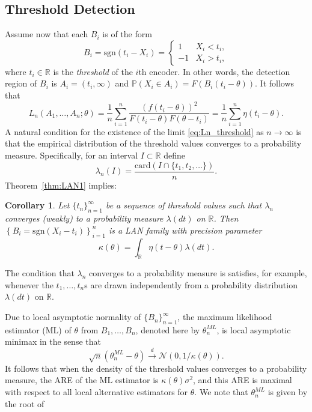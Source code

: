 \documentclass[letterpaper, 11pt]{IEEEtran}      %
\newtheorem{cor}[thm]{\bf {Corollary}}
\newcommand{\card}{\mathrm{card}}
\newcommand{\sgn}{\mathrm{sgn} }
\begin{document}
\subsection{Threshold Detection \label{subsec:threshold}}
Assume now that each $B_i$ is of the form
\begin{equation}
\label{eq:threshold_message}
B_i = \sgn(t_i - X_i) = \begin{cases} 1 & X_i< t_i, \\
-1 & X_i > t_i,
\end{cases}  
\end{equation}
where $t_i\in\mathbb R$ is the \emph{threshold} of the $i$th encoder. In other words, the detection region of $B_i$ is $A_i = (t_i,\infty)$ and $\mathbb P(X_i \in A_i) = F \left( B_i(t_i-\theta) \right)$. It follows that
\begin{equation}
L_n(A_1,\ldots,A_n;\theta) = \frac{1}{n} \sum_{i=1}^n \frac{ \left(f(t_i-\theta) \right)^2 }{F\left(t_i-\theta \right) F\left(\theta - t_i \right) }  = \frac{1}{n} \sum_{i=1}^n \eta(t_i - \theta).
\label{eq:Ln_threshold}
\end{equation}
A natural condition for the existence of the limit \eqref{eq:Ln_threshold} as $n\to \infty$ is that the empirical distribution of the threshold values converges to a probability measure. Specifically, for an interval $I \subset \mathbb R$ define
\[
\lambda_n(I) = \frac{ \card \left( I \cap \{t_1,t_2,\ldots \} \right)}{n}. 
\]
Theorem~\ref{thm:LAN1} implies:
\begin{cor} \label{cor:LAN_thresh}
Let $\{t_n\}_{n=1}^\infty$ be a sequence of threshold values such that $\lambda_n$ converges (weakly) to a probability measure $\lambda(dt)$ on $\mathbb R$. Then $\left\{ B_i = \sgn(X_i - t_i) \right\}_{i=1}^n$ is a LAN family with precision parameter
\[
\kappa(\theta) = \int_{\mathbb R} \eta(t-\theta) \lambda(dt). 
\]
\end{cor}
The condition that $\lambda_n$ converges to a probability measure is satisfies, for example, whenever the $t_1,\ldots,t_n$s are drawn independently from a probability distribution $\lambda(dt)$ on $\mathbb R$. \par
Due to local asymptotic normality of $\{B_n\}_{n=1}^\infty$, the maximum likelihood estimator (ML) of $\theta$ from $B_1,\ldots,B_n$, denoted here by 
${\theta}^{ML}_n$, is local asymptotic minimax in the sense that 
\[
\sqrt{n} \left( {\theta}^{ML}_n - \theta \right) \overset{d}{\longrightarrow} \mathcal{N} \left(0, 1/\kappa(\theta) \right). 
\]
It follows that when the density of the threshold values converges to a probability measure, the ARE of the ML estimator is $\kappa(\theta)\sigma^2$, and this ARE is maximal with respect to all local alternative estimators for $\theta$. We note that ${\theta}^{ML}_n$ is given by the root of 
\end{document}
